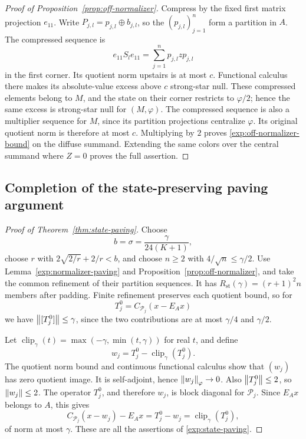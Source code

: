 \begin{proof}[Proof of Proposition~\ref{prop:off-normalizer}]
Compress by the fixed first matrix projection $e_{11}$. Write
$P_{j,l}=p_{j,l}\oplus b_{j,l}$, so the $(p_{j,l})_{j=1}^n$ form
a partition in $A$. The compressed sequence is
\[
 e_{11}S_le_{11}=\sum_{j=1}^n p_{j,l}z p_{j,l}
\]
in the first corner. Its quotient norm upstairs is at most $c$.
Functional calculus there makes its absolute-value excess above
$c$ strong-star null. These compressed elements belong to $M$,
and the state on their corner restricts to $\varphi/2$; hence the
same excess is strong-star null for $(M,\varphi)$. The compressed
sequence is also a multiplier sequence for $M$, since its
partition projections centralize $\varphi$. Its original quotient
norm is therefore at most $c$. Multiplying by $2$ proves
\eqref{exp:off-normalizer-bound} on the diffuse summand. Extending
the same colors over the central summand where $Z=0$ proves the
full assertion.
\end{proof}

\subsection{Completion of the state-preserving paving argument}

\begin{proof}[Proof of Theorem~\ref{thm:state-paving}]
Choose
\[
 b=\sigma=\frac{\gamma}{24(K+1)},
\]
choose $r$ with $2\sqrt{2/r}+2/r<b$, and choose $n\geq2$ with
$4/\sqrt n\leq\gamma/2$. Use Lemma~\ref{exp:normalizer-paving}
and Proposition~\ref{prop:off-normalizer}, and take the common
refinement of their partition sequences. It has
$R_{\mathrm{st}}(\gamma)=(r+1)^2n$ members after padding. Finite refinement
preserves each quotient bound, so for
\[
 T_j^0=C_{\mathcal P_j}(x-E_Ax)
\]
we have $\left\lVert[T_j^0]\right\rVert\leq\gamma$, since the two contributions
are at most $\gamma/4$ and $\gamma/2$.

Let $\operatorname{clip}_\gamma(t)=\max(-\gamma,
\min(t,\gamma))$ for real $t$, and define
\[
 w_j=T_j^0-\operatorname{clip}_\gamma(T_j^0).
\]
The quotient norm bound and continuous functional calculus show
that $(w_j)$ has zero quotient image. It is self-adjoint, hence
$\left\lVert w_j\right\rVert_\varphi\to0$. Also $\left\lVert T_j^0\right\rVert\leq2$, so
$\left\lVert w_j\right\rVert\leq2$. The operator $T_j^0$, and therefore $w_j$,
is block diagonal for $\mathcal P_j$. Since $E_Ax$ belongs to
$A$, this gives
\[
 C_{\mathcal P_j}(x-w_j)-E_Ax
 =T_j^0-w_j=\operatorname{clip}_\gamma(T_j^0),
\]
of norm at most $\gamma$. These are all the assertions of
\eqref{exp:state-paving}.
\end{proof}
